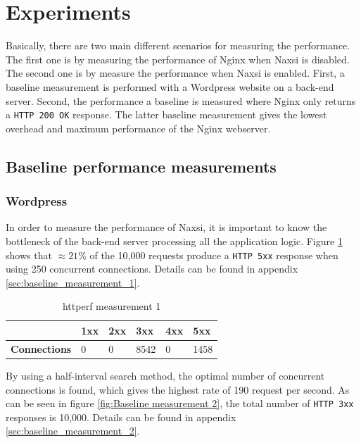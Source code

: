 \documentclass[Experiments]{subfiles}
\begin{document}
\section{Experiments}

\label{sec:Measurements}

Basically, there are two main different scenarios for measuring the performance. The first one is by measuring the performance of Nginx when Naxsi is disabled. The second one is by measure the performance when Naxsi is enabled.  First, a baseline measurement is performed with a Wordpress website on a back-end server. Second, the performance a baseline is measured where Nginx only returns a \verb+HTTP 200 OK+ response. The latter baseline measurement gives the lowest overhead and maximum performance of the Nginx webserver.

\subsection{Baseline performance measurements}

\subsubsection{Wordpress}
\label{sec:Baseline performance measurement}
In order to measure the performance of Naxsi, it is important to know the bottleneck of the back-end server processing all the application logic. Figure \ref{fig:Baseline measurement 1} shows that $\approx 21\%$ of the 10,000 requests produce a \verb+HTTP 5xx+ response when using 250 concurrent connections. Details can be found in appendix \ref{sec:baseline_measurement_1}.

\begin{table}[H]
\caption{httperf measurement 1}
\begin{tabular}{|p{2cm}|p{}|p{}|p{}|p{}|p{}|}
\hline
 & \textbf{1xx} & \textbf{2xx} & \textbf{3xx} & \textbf{4xx} & \textbf{5xx} \\ \hline
\textbf{Connections} & 0 & 0 & 8542 & 0 & 1458 \\ \hline
\end{tabular}
\label{fig:Baseline measurement 1}
\end{table}

By using a half-interval search method, the optimal number of concurrent connections is found, which gives the highest rate of 190 request per second. As can be seen in figure \ref{fig:Baseline measurement 2}, the total number of \verb+HTTP 3xx+ responses is 10,000. Details can be found in appendix \ref{sec:baseline_measurement_2}.
\end{document}
